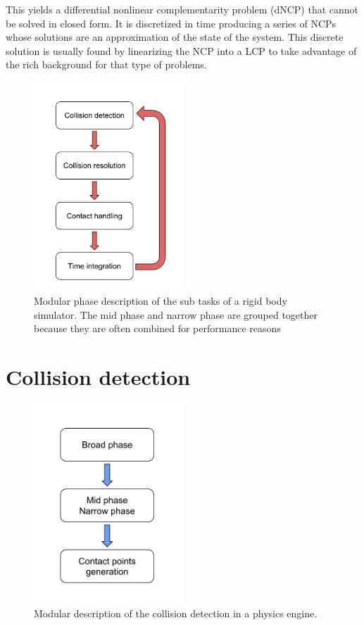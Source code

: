 This yields a differential nonlinear complementarity problem (dNCP) that cannot be solved in closed form. It is discretized in time producing a series of NCPs whose solutions are an approximation of the state of the system.  This discrete solution is usually found by linearizing the NCP into a LCP to take advantage of the rich background for that type of problems.

\begin{figure}[htp]
\center
\includegraphics[width=0.5\textwidth]{figures/star_simul_loop2}
\caption[Modular phase description of the sub tasks of a rigid body simulator]{Modular phase description of the sub tasks of a rigid body simulator. The mid phase and narrow phase are grouped together because they are often combined for performance reasons}
\label{fig:phase_simul}
\end{figure}

\section{Collision detection}
\begin{figure}
\center
\includegraphics[width=0.5\textwidth]{figures/STAR_collision}
\caption[Collision detection]{Modular description of the collision detection in a physics engine.}
\label{fig:star_collision}
\end{figure}


